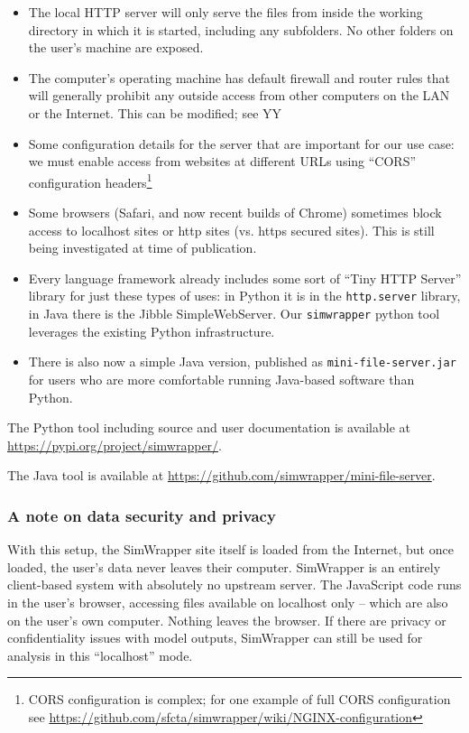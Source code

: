 \begin{itemize}
\item
  The local HTTP server will only serve the files from inside the
  working directory in which it is started, including any subfolders. No
  other folders on the user's machine are exposed.
\item
  The computer's operating machine has default firewall and router rules
  that will generally prohibit any outside access from other computers
  on the LAN or the Internet. This can be modified; see YY
\item
  Some configuration details for the server that are important for our
  use case: we must enable access from websites at different URLs using
  ``CORS'' configuration headers\footnote{CORS configuration is complex; for one example of full CORS configuration see \url{https://github.com/sfcta/simwrapper/wiki/NGINX-configuration}}
\item
  Some browsers (Safari, and now recent builds of Chrome) sometimes
  block access to localhost sites or http sites (vs. https secured sites).
  This is still being investigated at time of publication.
\item
  Every language framework already includes some sort of ``Tiny HTTP
  Server'' library for just these types of uses: in Python it is in the
  \texttt{http.server} library, in Java there is the Jibble
  SimpleWebServer. Our \texttt{simwrapper} python tool leverages the
  existing Python infrastructure.
\item
  There is also now a simple Java version, published as
  \texttt{mini-file-server.jar} for users who are more comfortable
  running Java-based software than Python.
\end{itemize}

The Python tool including source and user documentation is available at \url{https://pypi.org/project/simwrapper/}.

The Java tool is available at \url{https://github.com/simwrapper/mini-file-server}.

\hypertarget{simwrapper-data-security-and-privacy}{%
\subsubsection{A note on data security and privacy}\label{simwrapper-data-security-and-privacy}}

With this setup, the SimWrapper site itself is loaded from the Internet, but once loaded, the user's data never leaves their computer. SimWrapper is an entirely client-based system with absolutely no upstream server. The JavaScript code runs in the user's browser, accessing files available on localhost only -- which are also on the user's own computer. Nothing leaves the browser. If there are privacy or confidentiality issues with model outputs, SimWrapper can still be used for analysis in this ``localhost'' mode.


